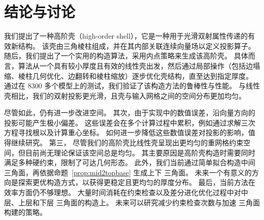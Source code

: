 ﻿\section{结论与讨论}\label{sec:conclusion}
我们提出了一种高阶壳（high-order shell），它是一种用于光滑双射属性传递的有效新结构。
该壳由三角棱柱组成，并在其内部关联连续向量场以定义投影算子。
%
随后，我们提出了一个实用的构造算法，采用内点策略来生成该高阶壳。
具体而言，算法从一个具有较小厚度且有效的线性壳出发，然后通过局部操作（包括边塌缩、棱柱几何优化、边翻转和棱柱缩放）逐步优化壳结构，直至达到指定厚度。
%
通过在 8300 多个模型上的测试，我们验证了该构造方法的鲁棒性与性能。
与线性壳相比，我们的双射投影更光滑，且壳与输入网格之间的空间分布更加均匀。


尽管如此，仍有进一步改进空间。
其次，由于实现中的数值误差，沿向量方向的投影可能产生极小偏差。
这些误差会在多个计算过程中累积，例如通过求解三次方程寻找根以及计算重心坐标。
如何进一步降低这些数值误差对投影的影响，值得继续研究。
第三，%
尽管我们的高阶壳比线性壳呈现出更均匀的重网格约束空间，但目前尚无理论保证该空间总是均匀。
其主要原因是高阶壳构造时需要同时满足多种硬约束，限制了可达几何形态。
%
此外，我们当前通过简单拟合构造中间 \Bezier 三角面，再依据命题~\ref{prop:mid2topbase} 生成上下 \Bezier 三角面。
未来一个有意义的方向是探索更优构造方式，以获得更稳定且更均匀的厚度分布。
最后，当前方法在效率方面仍不够理想。
大量时间消耗在约束检查以及差分进化优化过程中对中层、上层和下层 \Bezier 三角面的构造上。
%
未来可以研究减少约束检查次数与加速 \Bezier 三角面构建的策略。
